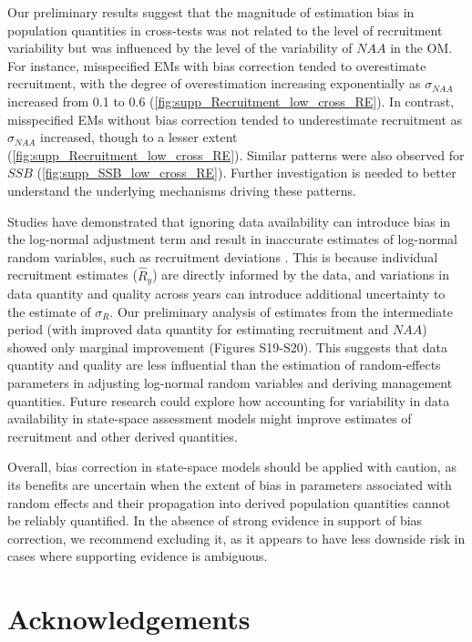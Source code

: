 \documentclass[
  12pt,
]{article}
\begin{document}
Our preliminary results suggest that the magnitude of estimation bias in
population quantities in cross-tests was not related to the level of
recruitment variability but was influenced by the level of the
variability of \(NAA\) in the OM. For instance, misspecified EMs with
bias correction tended to overestimate recruitment, with the degree of
overestimation increasing exponentially as \(\sigma_{NAA}\) increased
from 0.1 to 0.6 (\autoref{fig:supp_Recruitment_low_cross_RE}). In
contrast, misspecified EMs without bias correction tended to
underestimate recruitment as \(\sigma_{NAA}\) increased, though to a
lesser extent (\autoref{fig:supp_Recruitment_low_cross_RE}). Similar
patterns were also observed for \(SSB\)
(\autoref{fig:supp_SSB_low_cross_RE}). Further investigation is needed
to better understand the underlying mechanisms driving these patterns.

Studies have demonstrated that ignoring data availability can introduce
bias in the log-normal adjustment term and result in inaccurate
estimates of log-normal random variables, such as recruitment deviations
\citep{Methot2011, Thorson2016}. This is because individual recruitment
estimates (\(\hat{R}_{y}\)) are directly informed by the data, and
variations in data quantity and quality across years can introduce
additional uncertainty to the estimate of \(\sigma_{R}\). Our
preliminary analysis of estimates from the intermediate period (with
improved data quantity for estimating recruitment and \(NAA\)) showed
only marginal improvement (Figures S19-S20). This suggests that data
quantity and quality are less influential than the estimation of
random-effects parameters in adjusting log-normal random variables and
deriving management quantities. Future research could explore how
accounting for variability in data availability in state-space
assessment models might improve estimates of recruitment and other
derived quantities.

Overall, bias correction in state-space models should be applied with
caution, as its benefits are uncertain when the extent of bias in
parameters associated with random effects and their propagation into
derived population quantities cannot be reliably quantified. In the
absence of strong evidence in support of bias correction, we recommend
excluding it, as it appears to have less downside risk in cases where
supporting evidence is ambiguous.

\section{Acknowledgements}\label{acknowledgements}
\end{document}
